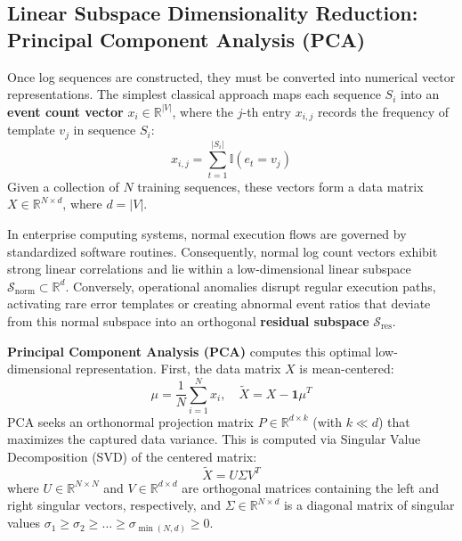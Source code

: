\subsection{Linear Subspace Dimensionality Reduction: Principal Component Analysis (PCA)}
\label{subsec:pca_foundations}
Once log sequences are constructed, they must be converted into numerical vector representations. The simplest classical approach maps each sequence $S_i$ into an \textbf{event count vector} $x_i \in \mathbb{R}^{|V|}$, where the $j$-th entry $x_{i,j}$ records the frequency of template $v_j$ in sequence $S_i$:
\begin{equation}
    x_{i,j} = \sum_{t=1}^{|S_i|} \mathbb{I}(e_t = v_j)
\end{equation}
Given a collection of $N$ training sequences, these vectors form a data matrix $X \in \mathbb{R}^{N \times d}$, where $d = |V|$.

In enterprise computing systems, normal execution flows are governed by standardized software routines. Consequently, normal log count vectors exhibit strong linear correlations and lie within a low-dimensional linear subspace $\mathcal{S}_{\text{norm}} \subset \mathbb{R}^d$. Conversely, operational anomalies disrupt regular execution paths, activating rare error templates or creating abnormal event ratios that deviate from this normal subspace into an orthogonal \textbf{residual subspace} $\mathcal{S}_{\text{res}}$.

\textbf{Principal Component Analysis (PCA)} computes this optimal low-dimensional representation. First, the data matrix $X$ is mean-centered:
\begin{equation}
    \mu = \frac{1}{N}\sum_{i=1}^N x_i, \quad \widetilde{X} = X - \mathbf{1}\mu^T
\end{equation}
PCA seeks an orthonormal projection matrix $P \in \mathbb{R}^{d \times k}$ (with $k \ll d$) that maximizes the captured data variance. This is computed via Singular Value Decomposition (SVD) of the centered matrix:
\begin{equation}
    \widetilde{X} = U \Sigma V^T
\end{equation}
where $U \in \mathbb{R}^{N \times N}$ and $V \in \mathbb{R}^{d \times d}$ are orthogonal matrices containing the left and right singular vectors, respectively, and $\Sigma \in \mathbb{R}^{N \times d}$ is a diagonal matrix of singular values $\sigma_1 \ge \sigma_2 \ge \dots \ge \sigma_{\min(N,d)} \ge 0$.

